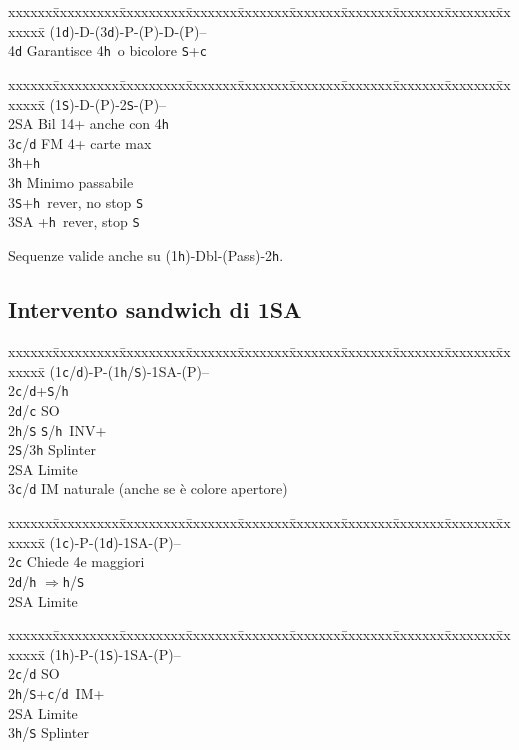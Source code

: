 \documentclass[a4paper,italian]{article}
\newcommand{\BS}{\small{\texttt{S}}}
\newcommand{\BC}{\small{\texttt{c}}}
\newcommand{\BD}{\small{\texttt{d}}}
\newcommand{\BH}{\small{\texttt{h}}}
\newenvironment{bidtable}
{\begin{tabbing}

    xxxxxx\=xxxxxxxxx\=xxxxxxxxx\=xxxxxxx\=xxxxxxx\=xxxxxxx\=xxxxxxx\=xxxxxxx\=xxxxxxx\=xxxxxxx\=\kill}
{\end{tabbing} }%
\begin{document}
\begin{multicols}{2}
    \begin{bidtable}
        (1\BD)-D-(3\BD)-P-(P)-D-(P)--\+\\
        4\BD \> Garantisce 4\BH\ o bicolore \BS +\BC \-
    \end{bidtable}

    \begin{bidtable}
        (1\BS)-D-(P)-2\BS-(P)--\+\\
        2\small{SA} \> Bil 14+ anche con 4\BH \\
        3\BC/\BD \> FM 4+ carte max\+\\
        3\BH {}+\BH \-\\
        3\BH \> Minimo passabile\\
        3\BS {}+\BH\ rever, no stop \BS\\
        3\small{SA} +\BH\ rever, stop \BS\-
    \end{bidtable}

    Sequenze valide anche su (1\BH )-Dbl-(Pass)-2\BH.

    \subsection{Intervento sandwich di 1\small{SA}}

    \begin{bidtable}
        (1\BC/\BD)-P-(1\BH/\BS)-1\small{SA}-(P)--\+\\
        2\BC/\BD{}+\BS/\BH\\
        2\BD/\BC\> SO\\
        2\BH/\BS{} \BS/\BH\ INV+\\
        2\BS/3\BH\> Splinter\\
        2\small{SA}\> Limite\\
        3\BC/\BD\> IM naturale (anche se è colore apertore)
    \end{bidtable}
    \begin{bidtable}
        (1\BC)-P-(1\BD)-1\small{SA}-(P)--\+\\
        2\BC\> Chiede 4e maggiori\\
        2\BD/\BH\> $\Rightarrow$\BH/\BS\\
        2\small{SA}\> Limite\-
    \end{bidtable}
    \begin{bidtable}
        (1\BH)-P-(1\BS)-1\small{SA}-(P)--\+\\
        2\BC/\BD\> SO\\
        2\BH/\BS{}+\BC/\BD\ IM+\\
        2\small{SA}\> Limite\\
        3\BH/\BS\> Splinter
    \end{bidtable}
    \vfill\null
    \columnbreak


\end{multicols}
\end{document}

